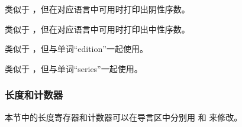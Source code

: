 \begin{ltxsyntax}

类似于 ，但在对应语言中可用时打印出阴性序数。


类似于 ，但在对应语言中可用时打印出中性序数。


类似于 ，但与单词“edition”一起使用。


类似于 ，但与单词“series”一起使用。

\end{ltxsyntax}

\subsubsection{长度和计数器}%
\label{use:fmt:len}


本节中的长度寄存器和计数器可以在导言区中分别用  和  来修改。

